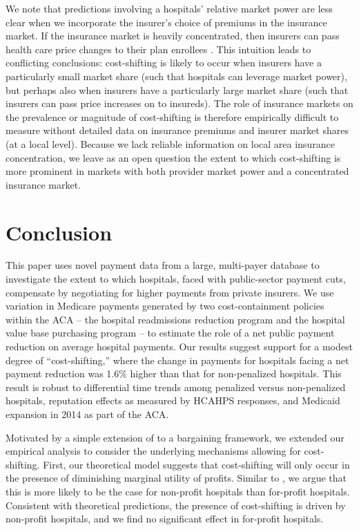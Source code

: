\documentclass[12pt]{article}
\begin{document}
We note that predictions involving a hospitals' relative market power are less clear when we incorporate the insurer's choice of premiums in the insurance market. If the insurance market is heavily concentrated, then insurers can pass health care price changes to their plan enrollees \citep{trish2015,ho2017}. This intuition leads to conflicting conclusions: cost-shifting is likely to occur when insurers have a particularly small market share (such that hospitals can leverage market power), but perhaps also when insurers have a particularly large market share (such that insurers can pass price increases on to insureds). The role of insurance markets on the prevalence or magnitude of cost-shifting is therefore empirically difficult to measure without detailed data on insurance premiums and insurer market shares (at a local level). Because we lack reliable information on local area insurance concentration, we leave as an open question the extent to which cost-shifting is more prominent in markets with both provider market power and a concentrated insurance market.

\section{Conclusion}
\label{sec:Conclusion}
This paper uses novel payment data from a large, multi-payer database to investigate the extent to which hospitals, faced with public-sector payment cuts, compensate by negotiating for higher payments from private insurers.  We use variation in Medicare payments generated by two cost-containment policies within the ACA -- the hospital readmissions reduction program and the hospital value base purchasing program -- to estimate the role of a net public payment reduction on average hospital payments.  Our results suggest support for a modest degree of ``cost-shifting,''  where the change in payments for hospitals facing a net payment reduction was 1.6$\%$ higher than that for non-penalized hospitals. This result is robust to differential time trends among penalized versus non-penalized hospitals, reputation effects as measured by HCAHPS responses, and Medicaid expansion in 2014 as part of the ACA.

Motivated by a simple extension of \cite{dranove1988} to a bargaining framework, we extended our empirical analysis to consider the underlying mechanisms allowing for cost-shifting. First, our theoretical model suggests that cost-shifting will only occur in the presence of diminishing marginal utility of profits. Similar to \cite{dranove1988}, we argue that this is more likely to be the case for non-profit hospitals than for-profit hospitals. Consistent with theoretical predictions, the presence of cost-shifting is driven by non-profit hospitals, and we find no significant effect in for-profit hospitals.
\end{document}
